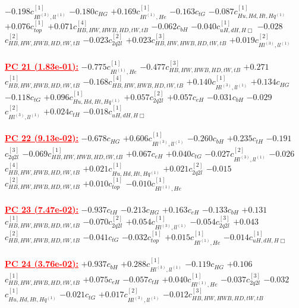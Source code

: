 \documentclass{article}
\begin{document}
{$-0.198$}{\rm $c_{Hl^{(3)},ll^{(1)}}^{[1]}$} 
{$-0.180$}{\rm $c_{HG}$} 
{$+0.169$}{\rm $c_{Hl^{(1)},He}^{[1]}$} 
{$-0.163$}{\rm $c_{tG}$} 
{$-0.087$}{\rm $c_{Hu,Hd,Ht,Hq^{(1)}}^{[1]}$} 
{$+0.076$}{\rm $c_{top}^{[1]}$} 
{$+0.071$}{\rm $c_{HB,HW,HWB,HD,tW,tB}^{[4]}$} 
{$-0.062$}{\rm $c_{bH}$} 
{$-0.040$}{\rm $c_{uH,dH,H\Box}^{[1]}$} 
{$-0.028$}{\rm $c_{HB,HW,HWB,HD,tW,tB}^{[2]}$} 
{$-0.023$}{\rm $c_{2q2l}^{[2]}$} 
{$+0.023$}{\rm $c_{HB,HW,HWB,HD,tW,tB}^{[3]}$} 
{$+0.019$}{\rm $c_{Hl^{(3)},ll^{(1)}}^{[2]}$} 
 \nonumber \\ \nonumber \\ 
\noindent \textcolor{red}{\underline{\bf{PC 21} (1.83e-01):}}
{$-0.775$}{\rm $c_{Hl^{(1)},He}^{[1]}$} 
{$-0.477$}{\rm $c_{HB,HW,HWB,HD,tW,tB}^{[3]}$} 
{$+0.271$}{\rm $c_{HB,HW,HWB,HD,tW,tB}^{[1]}$} 
{$-0.168$}{\rm $c_{HB,HW,HWB,HD,tW,tB}^{[4]}$} 
{$+0.140$}{\rm $c_{Hl^{(3)},ll^{(1)}}^{[1]}$} 
{$+0.134$}{\rm $c_{HG}$} 
{$-0.118$}{\rm $c_{tG}$} 
{$+0.096$}{\rm $c_{Hu,Hd,Ht,Hq^{(1)}}^{[1]}$} 
{$+0.057$}{\rm $c_{2q2l}^{[2]}$} 
{$+0.057$}{\rm $c_{eH}$} 
{$-0.031$}{\rm $c_{bH}$} 
{$-0.029$}{\rm $c_{Hl^{(3)},ll^{(1)}}^{[2]}$} 
{$+0.024$}{\rm $c_{tH}$} 
{$-0.018$}{\rm $c_{uH,dH,H\Box}^{[1]}$} 
 \nonumber \\ \nonumber \\ 
\noindent \textcolor{red}{\underline{\bf{PC 22} (9.13e-02):}}
{$-0.678$}{\rm $c_{HG}$} 
{$+0.606$}{\rm $c_{Hl^{(3)},ll^{(1)}}^{[1]}$} 
{$-0.260$}{\rm $c_{bH}$} 
{$+0.235$}{\rm $c_{tH}$} 
{$-0.191$}{\rm $c_{2q2l}^{[3]}$} 
{$-0.069$}{\rm $c_{HB,HW,HWB,HD,tW,tB}^{[1]}$} 
{$+0.067$}{\rm $c_{eH}$} 
{$+0.040$}{\rm $c_{tG}$} 
{$-0.027$}{\rm $c_{Hl^{(3)},ll^{(1)}}^{[2]}$} 
{$-0.026$}{\rm $c_{HB,HW,HWB,HD,tW,tB}^{[4]}$} 
{$+0.021$}{\rm $c_{Hu,Hd,Ht,Hq^{(1)}}^{[1]}$} 
{$+0.021$}{\rm $c_{2q2l}^{[2]}$} 
{$-0.015$}{\rm $c_{HB,HW,HWB,HD,tW,tB}^{[2]}$} 
{$+0.010$}{\rm $c_{top}^{[1]}$} 
{$-0.010$}{\rm $c_{Hl^{(1)},He}^{[1]}$} 
 \nonumber \\ \nonumber \\ 
\noindent \textcolor{red}{\underline{\bf{PC 23} (7.47e-02):}}
{$-0.937$}{\rm $c_{tH}$} 
{$-0.213$}{\rm $c_{HG}$} 
{$+0.163$}{\rm $c_{eH}$} 
{$-0.133$}{\rm $c_{bH}$} 
{$+0.131$}{\rm $c_{HB,HW,HWB,HD,tW,tB}^{[1]}$} 
{$-0.070$}{\rm $c_{2q2l}^{[2]}$} 
{$+0.054$}{\rm $c_{Hl^{(3)},ll^{(1)}}^{[1]}$} 
{$-0.054$}{\rm $c_{2q2l}^{[3]}$} 
{$+0.043$}{\rm $c_{HB,HW,HWB,HD,tW,tB}^{[2]}$} 
{$-0.041$}{\rm $c_{tG}$} 
{$-0.032$}{\rm $c_{top}^{[1]}$} 
{$+0.015$}{\rm $c_{Hl^{(1)},He}^{[1]}$} 
{$-0.014$}{\rm $c_{uH,dH,H\Box}^{[1]}$} 
 \nonumber \\ \nonumber \\ 
\noindent \textcolor{red}{\underline{\bf{PC 24} (3.76e-02):}}
{$+0.937$}{\rm $c_{bH}$} 
{$+0.288$}{\rm $c_{Hl^{(3)},ll^{(1)}}^{[1]}$} 
{$-0.119$}{\rm $c_{HG}$} 
{$+0.106$}{\rm $c_{HB,HW,HWB,HD,tW,tB}^{[1]}$} 
{$+0.075$}{\rm $c_{eH}$} 
{$-0.057$}{\rm $c_{tH}$} 
{$+0.040$}{\rm $c_{Hl^{(1)},He}^{[1]}$} 
{$-0.037$}{\rm $c_{2q2l}^{[3]}$} 
{$-0.032$}{\rm $c_{Hu,Hd,Ht,Hq^{(1)}}^{[1]}$} 
{$-0.021$}{\rm $c_{tG}$} 
{$+0.017$}{\rm $c_{Hl^{(3)},ll^{(1)}}^{[2]}$} 
{$-0.012$}{\rm $c_{HB,HW,HWB,HD,tW,tB}^{[3]}$} 
 \nonumber \\ \nonumber \\ 
\end{document}
